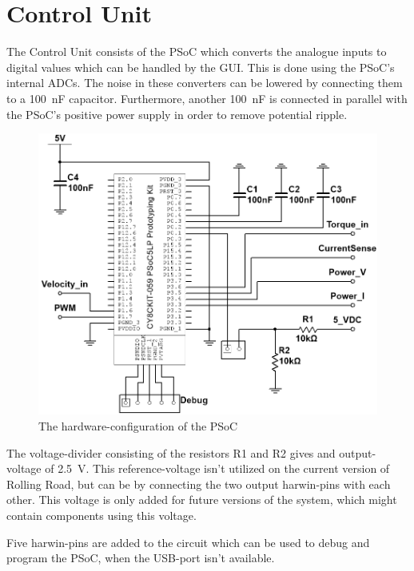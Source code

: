 \newpage
\section{Control Unit}
The Control Unit consists of the PSoC which converts the analogue inputs to digital values which can be handled by the GUI. This is done using the PSoC's internal ADCs. The noise in these converters can be lowered by connecting them to a \SI{100}{\nano \farad} capacitor. Furthermore, another \SI{100}{\nano \farad} is connected in parallel with the PSoC's positive power supply in order to remove potential ripple.

\begin{figure}[H]
	\centering
	\includegraphics[width=0.8\linewidth]{Hardware/Pictures/PSoC}
	\caption{The hardware-configuration of the PSoC}
	\label{fig:PSoC_Hardware}
\end{figure}

The voltage-divider consisting of the resistors R1 and R2 gives and output-voltage of \SI{2.5}{\volt}. This reference-voltage isn't utilized on the current version of Rolling Road, but can be by connecting the two output harwin-pins with each other. This voltage is only added for future versions of the  system, which might contain components using this voltage.

Five harwin-pins are added to the circuit which can be used to debug and program the PSoC, when the USB-port isn't available.